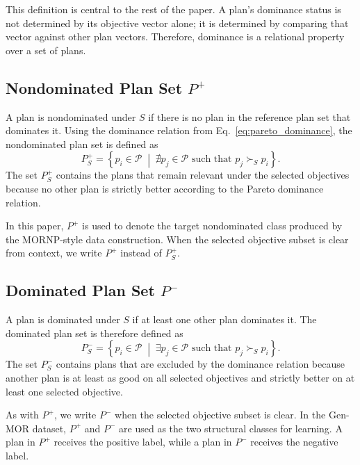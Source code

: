 This definition is central to the rest of the paper. A plan's dominance status is not determined by its objective vector alone; it is determined by comparing that vector against other plan vectors. Therefore, dominance is a relational property over a set of plans.

\subsection{Nondominated Plan Set $P^{+}$}
\label{subsec:nondominated_plan_set}

A plan is nondominated under $S$ if there is no plan in the reference plan set that dominates it. Using the dominance relation from Eq.~\eqref{eq:pareto_dominance}, the nondominated plan set is defined as
\begin{equation}
    P^{+}_{S}
    =
    \left\{
    p_i \in \mathcal{P}
    \;\middle|\;
    \nexists p_j \in \mathcal{P}
    \text{ such that }
    p_j \succ_S p_i
    \right\}.
    \label{eq:p_plus_definition}
\end{equation}
The set $P^{+}_{S}$ contains the plans that remain relevant under the selected objectives because no other plan is strictly better according to the Pareto dominance relation.

In this paper, $P^{+}$ is used to denote the target nondominated class produced by the MORNP-style data construction. When the selected objective subset is clear from context, we write $P^{+}$ instead of $P^{+}_{S}$.

\subsection{Dominated Plan Set $P^{-}$}
\label{subsec:dominated_plan_set}

A plan is dominated under $S$ if at least one other plan dominates it. The dominated plan set is therefore defined as
\begin{equation}
    P^{-}_{S}
    =
    \left\{
    p_i \in \mathcal{P}
    \;\middle|\;
    \exists p_j \in \mathcal{P}
    \text{ such that }
    p_j \succ_S p_i
    \right\}.
    \label{eq:p_minus_definition}
\end{equation}
The set $P^{-}_{S}$ contains plans that are excluded by the dominance relation because another plan is at least as good on all selected objectives and strictly better on at least one selected objective.

As with $P^{+}$, we write $P^{-}$ when the selected objective subset is clear. In the Gen-MOR dataset, $P^{+}$ and $P^{-}$ are used as the two structural classes for learning. A plan in $P^{+}$ receives the positive label, while a plan in $P^{-}$ receives the negative label.

